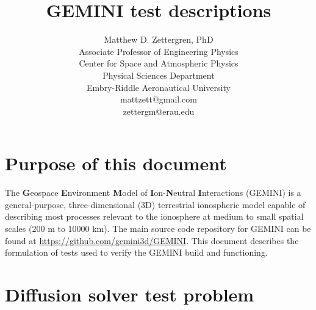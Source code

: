 \documentclass[11pt,letterpaper]{article}
\begin{document}
\setlength{\parindent}{0mm}
\setlength{\parskip}{0.4cm}




\title{\textbf{GEMINI} test descriptions}
\author{Matthew D. Zettergren, PhD\\ Associate Professor of Engineering Physics\\ Center for Space and Atmospheric Physics\\ Physical Sciences Department \\Embry-Riddle Aeronautical University\\mattzett@gmail.com\\zettergm@erau.edu}
\maketitle

\tableofcontents

\pagebreak


\section{Purpose of this document}

The \textbf{G}eospace \textbf{E}nvironment \textbf{M}odel of \textbf{I}on-\textbf{N}eutral \textbf{I}nteractions (GEMINI) is a general-purpose, three-dimensional (3D) terrestrial ionospheric model capable of describing most processes relevant to the ionosphere at medium to small spatial scales (200 m to 10000 km).  The main source code repository for GEMINI can be found at \url{https://github.com/gemini3d/GEMINI}.  This document describes the formulation of tests used to verify the GEMINI build and functioning.  


\section{Diffusion solver test problem}
\end{document}
